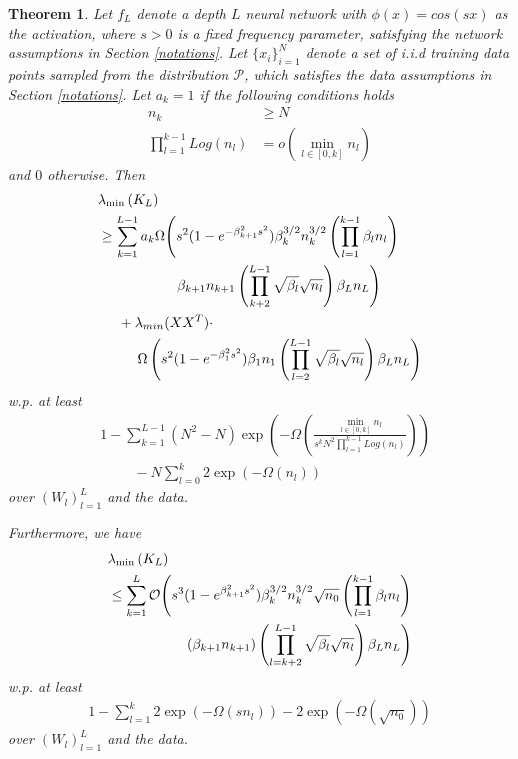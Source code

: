 \documentclass{article}
\theoremstyle{plain}
\newtheorem{Theorem}{Theorem}[section]
\theoremstyle{definition}
\theoremstyle{remark}
\begin{document}
\begin{Theorem}\label{main_result_ntk}
Let $f_L$ denote a depth $L$ neural network with $\phi(x) = cos(sx)$ as the activation, where $s > 0$ is a fixed frequency parameter, satisfying the network assumptions in Section \ref{notations}.
Let $\{x_i\}_{i=1}^N$ denote a set of i.i.d training data points sampled from the distribution $\mathcal{P}$, which satisfies the data assumptions in Section \ref{notations}.
Let 
$a_k = 1$ if the following conditions holds
\begin{align*}
    n_k &\geq N \\
    \prod_{l=1}^{k-1}Log(n_l) &= o\left(\min_{l \in [0,k]}n_l\right)
\end{align*}
and $0$ otherwise. Then
\begin{align*}
    &\lambda_{\min}\left(K_L\right) \\
    &\geq \sum_{k=1}^{L-1}a_k\Omega\Bigg{(}
    s^2(1 - e^{-\beta_{k+1}^2s^2})\beta_k^{3/2}n_k^{3/2} 
    \left(
    \prod_{l=1}^{k-1}\beta_ln_l
    \right) \\
    &\hspace{2cm}\beta_{k+1}n_{k+1}
    \left(
    \prod_{k+2}^{L-1}\sqrt{\beta_l}\sqrt{n_l}
    \right)\beta_Ln_L\Bigg{)} \\
    &\hspace{0.5cm} +
    \lambda_{min}(XX^T) \cdot \\
    &\hspace{1cm}\Omega\left(
    s^2(1 - e^{-\beta_1^2s^2})\beta_1n_1\left(\prod_{l=2}^{L-1} 
    \sqrt{\beta_l}\sqrt{n_l}\right)\beta_Ln_L
    \right)
\end{align*}
w.p. at least
\begin{align*}
    & 1 - \sum_{k=1}^{L-1}(N^2-N)\exp\left(-
\Omega\left(
\frac{\min_{l \in [0,k]}n_l}{s^kN^2\prod_{l=1}^{k-1}Log(n_l)}
\right)
\right) \\
&\hspace{1cm}- N\sum_{l=0}^k2\exp(-\Omega(n_l))
\end{align*}
over $(W_l)_{l=1}^L$ and the data.

Furthermore, we have 
\begin{align*}
    &\lambda_{\min}\left(K_L\right) \\
    &\leq \sum_{k=1}^L\mathcal{O}\Bigg{(}
    s^3(1-e^{\beta_{k+1}^2s^2})\beta_k^{3/2}n_k^{3/2}\sqrt{n_0}
    \left(
    \prod_{l=1}^{k-1}\beta_ln_l 
    \right) \\
    &\hspace{2cm}(\beta_{k+1}n_{k+1})
    \left(
    \prod_{l=k+2}^{L-1}\sqrt{\beta_l}\sqrt{n_l}
    \right)\beta_Ln_L
    \Bigg{)}
\end{align*}
w.p. at least
\begin{align*}
    1 - \sum_{l=1}^k2\exp(-\Omega(sn_l)) - 2\exp(-\Omega(\sqrt{n_0}))
\end{align*}
over $(W_l)_{l=1}^L$ and the data.
\end{Theorem}
\end{document}

